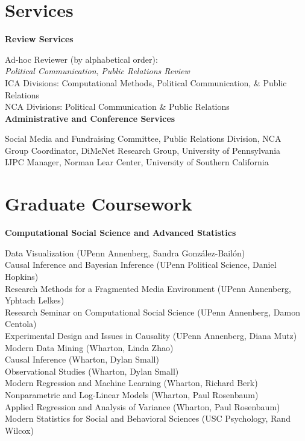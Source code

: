\documentclass[12pt, letterpaper]{article}
\newcommand{\years}[1]{\marginnote{\normalsize #1}}
\begin{document}
{%
\section*{Services}

\textbf{Review Services}

  \years{2019-} Ad-hoc Reviewer (by alphabetical order):\\
  \years{} \hspace*{2em} \textit{Political Communication}, \textit{Public Relations Review}\\
  \years{2017-} ICA Divisions: Computational Methods, Political Communication, \& Public Relations\\
  \years{2016-} NCA Divisions: Political Communication \& Public Relations\\

\textbf{Administrative and Conference Services}
  
  \years{2019-} Social Media and Fundraising Committee, Public Relations Division, NCA\\
  \years{2018-}Group Coordinator, DiMeNet Research Group, University of Pennsylvania\\
  \years{2015-17}IJPC Manager, Norman Lear Center, University of Southern California


\section*{Graduate Coursework}

\textbf{Computational Social Science and Advanced Statistics}

  \years{} Data Visualization (UPenn Annenberg, Sandra González-Bailón)\\
  \years{} Causal Inference and Bayesian Inference (UPenn Political Science, Daniel Hopkins)\\
  \years{} Research Methods for a Fragmented Media Environment (UPenn Annenberg, Yphtach Lelkes)\\
  \years{} Research Seminar on Computational Social Science (UPenn Annenberg, Damon Centola)\\
  \years{} Experimental Design and Issues in Causality (UPenn Annenberg, Diana Mutz)\\
  \years{} Modern Data Mining (Wharton, Linda Zhao)\\
  \years{} Causal Inference (Wharton, Dylan Small)\\
  \years{} Observational Studies (Wharton, Dylan Small)\\
  \years{} Modern Regression and Machine Learning (Wharton, Richard Berk)\\
  \years{} Nonparametric and Log-Linear Models (Wharton, Paul Rosenbaum)\\
  \years{} Applied Regression and Analysis of Variance (Wharton, Paul Rosenbaum)\\
  \years{} Modern Statistics for Social and Behavioral Sciences (USC Psychology, Rand Wilcox)\\

}
\end{document}
